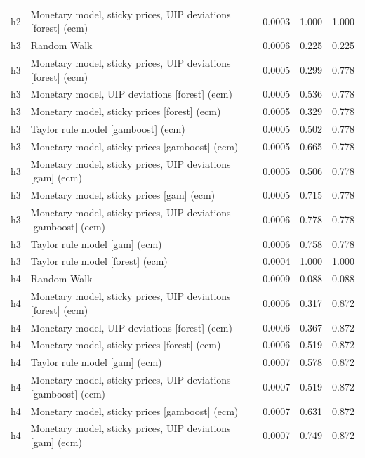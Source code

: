 \begin{ThreePartTable}
\begin{longtable}[t]{cp{5.5cm}ccc}
h2 & \raggedright Monetary model, sticky prices, UIP deviations [forest] (ecm) & 0.0003 & 1.000 & 1.000\\
\addlinespace
h3 & \raggedright Random Walk & 0.0006 & 0.225 & 0.225\\
h3 & \raggedright Monetary model, sticky prices, UIP deviations [forest] (ecm) & 0.0005 & 0.299 & 0.778\\
h3 & \raggedright Monetary model, UIP deviations [forest] (ecm) & 0.0005 & 0.536 & 0.778\\
h3 & \raggedright Monetary model, sticky prices [forest] (ecm) & 0.0005 & 0.329 & 0.778\\
h3 & \raggedright Taylor rule model [gamboost] (ecm) & 0.0005 & 0.502 & 0.778\\
h3 & \raggedright Monetary model, sticky prices [gamboost] (ecm) & 0.0005 & 0.665 & 0.778\\
h3 & \raggedright Monetary model, sticky prices, UIP deviations [gam] (ecm) & 0.0005 & 0.506 & 0.778\\
h3 & \raggedright Monetary model, sticky prices [gam] (ecm) & 0.0005 & 0.715 & 0.778\\
h3 & \raggedright Monetary model, sticky prices, UIP deviations [gamboost] (ecm) & 0.0006 & 0.778 & 0.778\\
h3 & \raggedright Taylor rule model [gam] (ecm) & 0.0006 & 0.758 & 0.778\\
h3 & \raggedright Taylor rule model [forest] (ecm) & 0.0004 & 1.000 & 1.000\\
\addlinespace
h4 & \raggedright Random Walk & 0.0009 & 0.088 & 0.088\\
h4 & \raggedright Monetary model, sticky prices, UIP deviations [forest] (ecm) & 0.0006 & 0.317 & 0.872\\
h4 & \raggedright Monetary model, UIP deviations [forest] (ecm) & 0.0006 & 0.367 & 0.872\\
h4 & \raggedright Monetary model, sticky prices [forest] (ecm) & 0.0006 & 0.519 & 0.872\\
h4 & \raggedright Taylor rule model [gam] (ecm) & 0.0007 & 0.578 & 0.872\\
h4 & \raggedright Monetary model, sticky prices, UIP deviations [gamboost] (ecm) & 0.0007 & 0.519 & 0.872\\
h4 & \raggedright Monetary model, sticky prices [gamboost] (ecm) & 0.0007 & 0.631 & 0.872\\
h4 & \raggedright Monetary model, sticky prices, UIP deviations [gam] (ecm) & 0.0007 & 0.749 & 0.872\\

\end{longtable}
\end{ThreePartTable}
